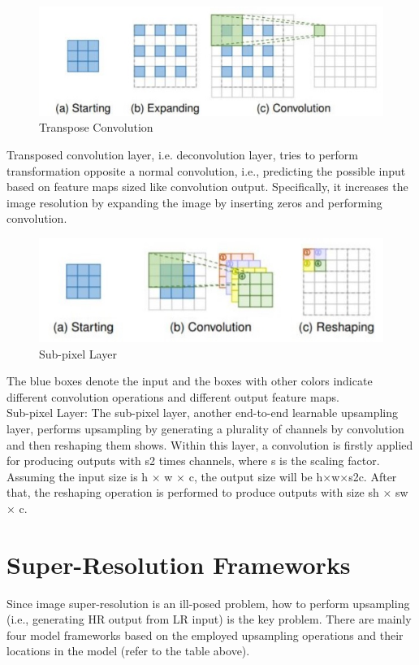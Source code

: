 \begin{figure}[h]
    \centering
    \includegraphics[totalheight=1.5in]{Chapter2/up.jpg}
    \caption[Transpose Convolution]{Transpose Convolution  \cite{DLSR}}
    \label{fig:label2.2}
\end{figure}
Transposed convolution layer, i.e. deconvolution layer, tries to perform transformation opposite a normal convolution, i.e., predicting the possible input based on feature maps sized like convolution output. Specifically, it increases the image resolution by expanding the image by inserting zeros and performing convolution.
\begin{figure}[h]
    \centering
    \includegraphics[totalheight=1.5in]{Chapter2/Transposed.jpg}
    \caption[Sub-pixel Layer]{Sub-pixel Layer \cite{DLSR}}
    \label{fig:label2.3}
\end{figure}
The blue boxes denote the input and the boxes with other colors indicate different convolution operations and different output feature maps.\\
Sub-pixel Layer: The sub-pixel layer, another end-to-end learnable upsampling layer, performs upsampling by generating a plurality of channels by convolution and then reshaping them shows. Within this layer, a convolution is firstly applied for producing outputs with
s2 times channels, where s is the scaling factor. Assuming the input size is h × w × c, the output size will be h×w×s2c. After that, the reshaping operation is performed to produce outputs with size sh × sw × c.\\

\section{Super-Resolution Frameworks}
Since image super-resolution is an ill-posed problem, how to perform upsampling (i.e., generating HR output from LR input) is the key problem. There are mainly four model frameworks based on the employed upsampling operations and their locations in the model (refer to the table above).\\

